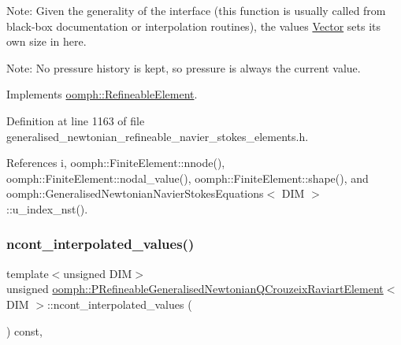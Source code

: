 Note\+: Given the generality of the interface (this function is usually called from black-\/box documentation or interpolation routines), the values \hyperlink{classoomph_1_1Vector}{Vector} sets its own size in here.

Note\+: No pressure history is kept, so pressure is always the current value. 

Implements \hyperlink{classoomph_1_1RefineableElement_ada6f0efe831ffefb1d2829ce01d45bfc}{oomph\+::\+Refineable\+Element}.



Definition at line 1163 of file generalised\+\_\+newtonian\+\_\+refineable\+\_\+navier\+\_\+stokes\+\_\+elements.\+h.



References i, oomph\+::\+Finite\+Element\+::nnode(), oomph\+::\+Finite\+Element\+::nodal\+\_\+value(), oomph\+::\+Finite\+Element\+::shape(), and oomph\+::\+Generalised\+Newtonian\+Navier\+Stokes\+Equations$<$ D\+I\+M $>$\+::u\+\_\+index\+\_\+nst().

\mbox{\label{classoomph_1_1PRefineableGeneralisedNewtonianQCrouzeixRaviartElement_ad06beb84a9e912db67814f0eb8add2fb}} 
\subsubsection{\texorpdfstring{ncont\+\_\+interpolated\+\_\+values()}{ncont\_interpolated\_values()}}
{\footnotesize\ttfamily template$<$unsigned D\+IM$>$ \\
unsigned \hyperlink{classoomph_1_1PRefineableGeneralisedNewtonianQCrouzeixRaviartElement}{oomph\+::\+P\+Refineable\+Generalised\+Newtonian\+Q\+Crouzeix\+Raviart\+Element}$<$ D\+IM $>$\+::ncont\+\_\+interpolated\+\_\+values (\begin{DoxyParamCaption}{ }\end{DoxyParamCaption}) const\hspace{0.3cm}{\ttfamily [inline]}, {\ttfamily [virtual]}}



